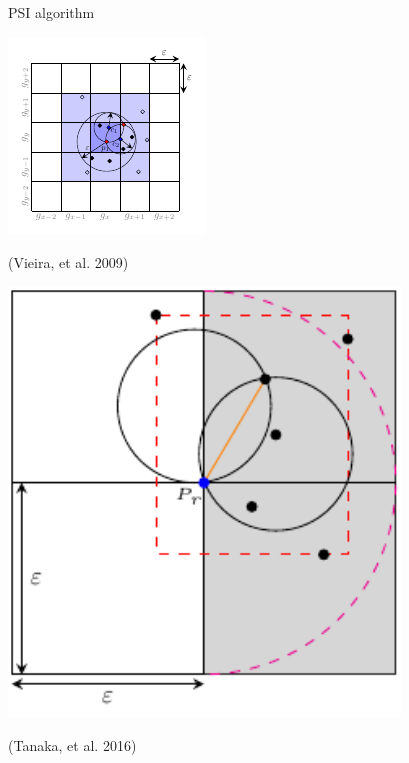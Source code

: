 \begin{frame}{PSI algorithm}
    \begin{minipage}{0.5\textwidth}
        \centering
        \includegraphics[width=\textwidth]{../thesis/chapterPFlocks/figures/grid_prime}
        \begin{flushright}
            {\tiny (Vieira, et al. 2009)}
        \end{flushright}
    \end{minipage}\hfill %
    \begin{minipage}{0.5\textwidth}
        \vspace{6mm}
        \centering
        \includegraphics[width=0.78\textwidth]{../thesis/chapterPFlocks/figures/square}
        \begin{flushright}
            {\tiny (Tanaka, et al. 2016)}
        \end{flushright}
    \end{minipage}
\end{frame}


